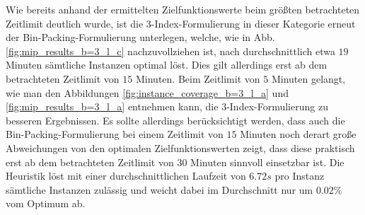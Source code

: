Wie bereits anhand der ermittelten Zielfunktionswerte beim größten betrachteten Zeitlimit deutlich wurde,
ist die 3-Index-Formulierung in dieser Kategorie erneut der Bin-Packing-Formulierung unterlegen,
welche, wie in Abb. \ref{fig:mip_results_b=3_l_c} nachzuvollziehen ist, nach durchschnittlich etwa $19$ Minuten sämtliche Instanzen optimal löst. Dies gilt allerdings erst ab dem betrachteten Zeitlimit
von $15$ Minuten. Beim Zeitlimit von $5$ Minuten gelangt, wie man den Abbildungen \ref{fig:instance_coverage_b=3_l_a} und \ref{fig:mip_results_b=3_l_a} entnehmen kann, die 3-Index-Formulierung zu besseren Ergebnissen.
Es sollte allerdings berücksichtigt werden, dass auch die Bin-Packing-Formulierung bei einem Zeitlimit von
$15$ Minuten noch derart große Abweichungen von den optimalen Zielfunktionswerten zeigt, dass diese
praktisch erst ab dem betrachteten Zeitlimit von $30$ Minuten sinnvoll einsetzbar ist.
Die Heuristik löst mit einer durchschnittlichen Laufzeit von $6.72s$ pro Instanz sämtliche Instanzen
zulässig und weicht dabei im Durchschnitt nur um $0.02 \%$ vom Optimum ab.

